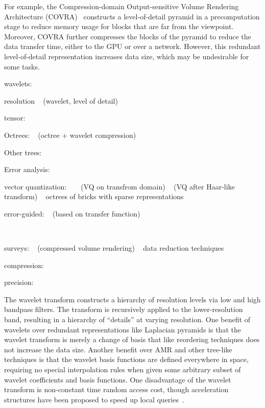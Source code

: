 For example, the Compression-domain Output-sensitive Volume Rendering Architecture
(COVRA)~\cite{covra2012} constructs a level-of-detail pyramid in a precomputation stage to reduce
memory usage for blocks that are far from the viewpoint. Moreover, COVRA further compresses the
blocks of the pyramid to reduce the data transfer time, either to the GPU or over a network.
However, this redundant level-of-detail representation increases data size, which may be undesirable
for some tasks.

wavelets:
~\cite{treib}
~\cite{multires-framework}
~\cite{compression-domain-volume-rendering}
~\cite{interactive-rendering-large-volume}
~\cite{rapid-compression-volume}
~\cite{survey-multires}
~\cite{multires_toolkit2003}
~\cite{wavelet-compression-interactive-vis}

resolution
~\cite{multires-volume-rendering} (wavelet, level of detail)
~\cite{in-situ-sampling-particle}

tensor:
~\cite{tensor_dvr2015}
~\cite{multiscale-tensor}
~\cite{tamresh}

Octrees:
~\cite{sph-octree} (octree + wavelet compression)

Other trees:

Error analysis:
~\cite{evaluating-compression-climate}
~\cite{compression_sim2013}
~\cite{statistical-volume-quality}
~\cite{evaluating-efficacy-wavelet}
~\cite{topology-verification-isosurface}
~\cite{verifiable-isosurface}
~\cite{verifying-volume-rendering}
~\cite{statistical-volume-quality}

vector quantization:
~\cite{vq1992}
~\cite{hw_dvr2007} (VQ on transfrom domain)
~\cite{compression_domain2003} (VQ after Haar-like transform)
~\cite{covra2012} octrees of bricks with sparse representations

error-guided: 
~\cite{tf_decompression2004} (based on transfer function)

~\cite{spgrid2014}

surveys:
~\cite{state-of-the-art-compressed-volume} (compressed volume rendering)
~\cite{li2018} data reduction techniques

compression:
~\cite{isabela}
~\cite{fpzip}
~\cite{sz}
~\cite{zfp2014}

precision:
~\cite{ezw}
~\cite{spiht1996}
~\cite{mloc}
~\cite{sbhp2000}
~\cite{jpeg2001}

The wavelet transform constructs a hierarchy of resolution levels via low and high bandpass filters.
The transform is recursively applied to the lower-resolution band, resulting in a hierarchy of
``details'' at varying resolution. One benefit of wavelets over redundant representations like
Laplacian pyramids is that the wavelet transform is merely a change of basis that like reordering
techniques does not increase the data size. Another benefit over AMR and other tree-like techniques
is that the wavelet basis functions are defined everywhere in space, requiring no special
interpolation rules when given some arbitrary subset of wavelet coefficients and basis functions.
One disadvantage of the wavelet transform is non-constant time random access cost, though
acceleration structures have been proposed to speed up local queries~\cite{weiss}.

